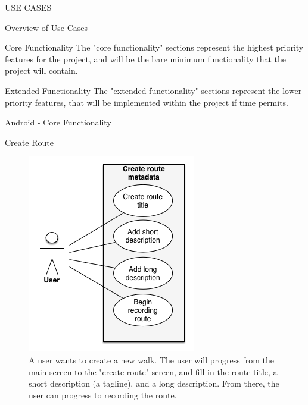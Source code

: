 \documentclass{article}
\begin{document}
	\begin{section}{USE CASES}
		\begin{subsection}{Overview of Use Cases}
			\begin{subsubsection}{Core Functionality}
				The "core functionality" sections represent the highest priority features for the project, and will be the bare minimum functionality that the project will contain.
			\end{subsubsection}
			
			\begin{subsubsection}{Extended Functionality}
				The "extended functionality" sections represent the lower priority features, that will be implemented within the project if time permits.			
			\end{subsubsection}
		\end{subsection}
		
		\clearpage
		\begin{subsection}{Android - Core Functionality}
			\begin{subsubsection}{Create Route}
				\begin{figure}[h!]
					\begin{center}
						\includegraphics[height=0.55\columnwidth]{images/UseCase/Android/Core/CreateRoute.png}
					\end{center}
					\caption{A user wants to create a new walk. The user will progress from the main screen to the "create route" screen, and fill in the route title, a short description (a tagline), and a long description. From there, the user can progress to recording the route.}
				\end{figure}
			\end{subsubsection}
			

\end{subsection}
\end{section}
\end{document}
